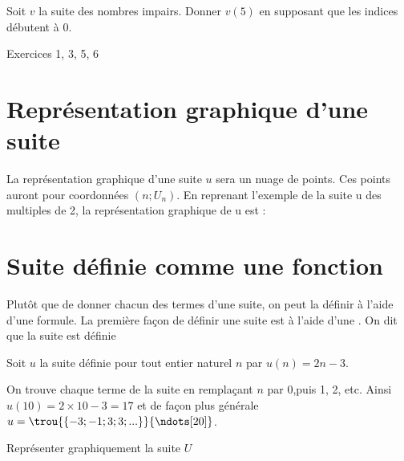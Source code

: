 \documentclass[a4paper,12pt]{article}
\begin{document}
Soit $v$ la suite des nombres impairs. Donner $v(5)$ en supposant que les indices débutent à 0. \par
\vspace{1em}
{\vspace{2em}}


\begin{tcolorbox}[colback=blue!10!white, colframe=blue!75!black, title=Exercices]
  Exercices 1, 3, 5, 6
\end{tcolorbox}

\section*{Représentation graphique d'une suite}
\vspace{1em}

La représentation graphique d'une suite $u$ sera un nuage de points. Ces points auront pour coordonnées $(n ; U_n)$.
En reprenant l'exemple de la suite u des multiples de 2, la représentation graphique de u est :

{\vspace{7em}}

\section*{Suite définie comme une fonction}
\vspace{1em}

Plutôt que de donner chacun des termes d'une suite, on peut la définir à l'aide d'une formule. La première façon de définir une suite est à l'aide d'une .
On dit que la suite est définie 

\begin{tcolorbox}[colback=blue!10!white, colframe=blue!75!black, title=Exercices]
  Soit $u$ la suite définie pour tout entier naturel $n$ par $u(n) = 2n - 3$. \par 
  On trouve chaque terme de la suite en remplaçant $n$ par 0,puis 1, 2, etc.
  Ainsi $u(10) = 2 \times 10 - 3 = 17$ et de façon plus générale $u = { \trou{\{-3 ; -1 ; 3; 3 ; ...\}}{\ndots[20]}}$. \par
  \vspace{1em}
  Représenter graphiquement la suite $U$
  \vspace{6em}
\end{tcolorbox}
\end{document}
